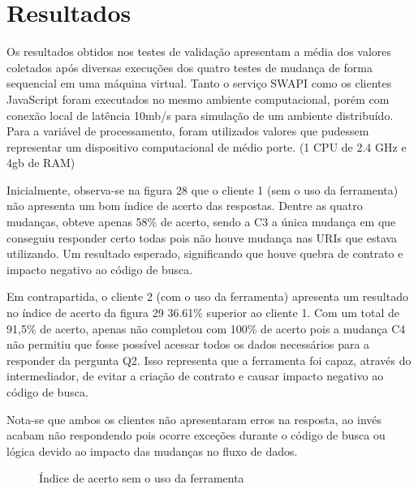 \section{Resultados}

Os resultados obtidos nos testes de validação apresentam a média dos valores coletados após diversas execuções dos quatro testes de mudança de forma sequencial em uma máquina virtual. Tanto o serviço SWAPI como os clientes JavaScript foram executados no mesmo ambiente computacional, porém com conexão local de latência 10mb/s para simulação de um ambiente distribuído. Para a variável de processamento, foram utilizados valores que pudessem representar um dispositivo computacional de médio porte. (1 CPU de 2.4 GHz e 4gb de RAM)

Inicialmente, observa-se na figura 28 que o cliente 1 (sem o uso da ferramenta) não apresenta um bom índice de acerto das respostas. Dentre as quatro mudanças, obteve apenas 58\% de acerto, sendo a C3 a única mudança em que conseguiu responder certo todas pois não houve mudança nas URIs que estava utilizando. Um resultado esperado, significando que houve quebra de contrato e impacto negativo ao código de busca.

Em contrapartida, o cliente 2 (com o uso da ferramenta) apresenta um resultado no índice de acerto da figura 29 36.61\% superior ao cliente 1. Com um total de 91,5\% de acerto, apenas não completou com 100\% de acerto pois a mudança C4 não permitiu que fosse possível acessar todos os dados necessários para a responder da pergunta Q2. Isso representa que a ferramenta foi capaz, através do intermediador, de evitar a criação de contrato e causar impacto negativo ao código de busca.

Nota-se que ambos os clientes não apresentaram erros na resposta, ao invés acabam não respondendo pois ocorre exceções durante o código de busca ou lógica devido ao impacto das mudanças no fluxo de dados.

\begin{figure}[H]
  \centering
  \caption{Índice de acerto sem o uso da ferramenta}
\end{figure}

